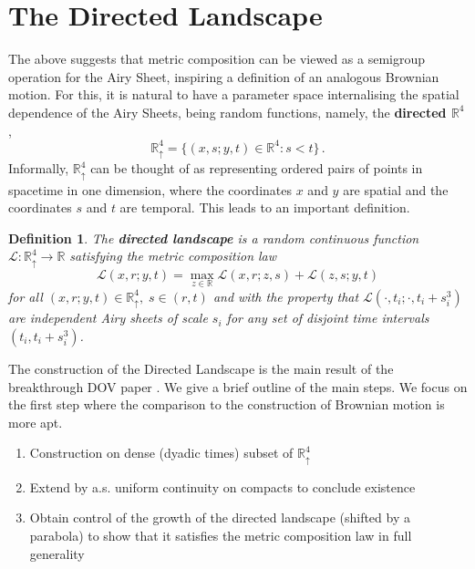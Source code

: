 \documentclass[12pt]{report}
\theoremstyle{plain}
\newtheorem{definition}{Definition}[section]
\newcommand{\R}{\ensuremath{\mathbb{R}}}
\begin{document}
\section{The Directed Landscape} 

The above suggests that metric composition can be viewed as a semigroup operation for the Airy Sheet, inspiring a definition of an analogous Brownian motion. For this, it is natural to have a parameter space internalising the spatial dependence of the Airy Sheets, being random functions, namely, the \textbf{directed $\R^4$},
$$
\mathbb R^4_\uparrow=\{(x,s;y,t)\in \R^4:s<t\}\,.
$$
Informally, $\R^4_\uparrow$ can be thought of as representing ordered pairs of points in spacetime in one dimension, where the coordinates $x$ and $y$ are spatial and the coordinates $s$ and $t$ are temporal. This leads to an important definition.

\begin{definition}\label{D:directed-landscape}The {\bf directed landscape} is a random continuous function $\mathcal{L}:\mathbb R^4_\uparrow \to \mathbb R$ satisfying the metric composition law
\begin{equation}
\label{E:dland-metric}
\mathcal{L}(x,r;y,t)=\max_{z\in \mathbb R} \mathcal{L}(x,r;z,s)+\mathcal{L}(z,s;y,t)
\end{equation}
for all \((x,r;y,t) \in  \mathbb R^4_\uparrow,\; s\in (r,t)\) and with the property that $\mathcal{L}(\cdot,t_i;\cdot,t_i+s_i^3)$
are independent Airy sheets of scale $s_i$ for any set of disjoint time intervals $(t_i,t_i+s_i^3)$.
\end{definition}

The construction of the Directed Landscape is the main result of the breakthrough DOV paper \cite{DOV}. We give a brief outline of the main steps. We focus on the first step where the comparison to the construction of Brownian motion is more apt.

\begin{enumerate}
    \item Construction on dense (dyadic times) subset of \(\R^4_\uparrow\)\label{enum: one}
    \item Extend by a.s. uniform continuity on compacts to conclude existence \label{enum: two}
    \item Obtain control of the growth of the directed landscape (shifted by a parabola) to show that it satisfies the metric composition law in full generality
    \label{enum: three}
\end{enumerate}
\end{document}

